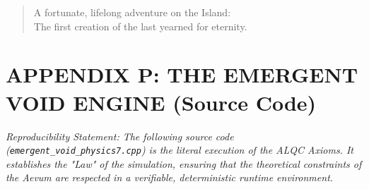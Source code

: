 \documentclass[12pt]{amsart}
\begin{document}
\begin{verse}
A fortunate, lifelong adventure on the Island:\\
The first creation of the last yearned for eternity.
\end{verse}

\newpage
\section{APPENDIX P: THE EMERGENT VOID ENGINE (Source Code)}
\label{app:emergent_void}

\textit{Reproducibility Statement: The following source code (\texttt{emergent\_void\_physics7.cpp}) is the literal execution of the ALQC Axioms. It establishes the "Law" of the simulation, ensuring that the theoretical constraints of the Aevum are respected in a verifiable, deterministic runtime environment.}
\end{document}
